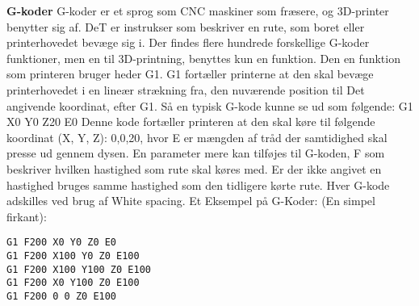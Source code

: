 \textbf{G-koder}
G-koder er et sprog som CNC maskiner som fræsere, og 3D-printer benytter sig af. DeT er instrukser som beskriver en rute, som boret eller printerhovedet bevæge sig i\cite{gkode}. 
Der findes flere hundrede forskellige G-koder funktioner, men en til 3D-printning, benyttes kun en funktion. Den en funktion som printeren bruger heder G1. G1 fortæller printerne at den skal bevæge printerhovedet i en lineær strækning fra, den nuværende position til Det angivende koordinat, efter G1.
Så en typisk G-kode kunne se ud som følgende: \newline
G1 X0 Y0 Z20 E0
\newline
Denne kode fortæller printeren at den skal køre til følgende koordinat (X, Y, Z): 0,0,20, hvor E er mængden af tråd der samtidighed skal presse ud gennem dysen.
En parameter mere kan tilføjes til G-koden, F som beskriver hvilken hastighed som rute skal køres med. Er der ikke angivet en hastighed bruges samme hastighed som den tidligere kørte rute. 
Hver G-kode adskilles ved brug af White spacing.
Et Eksempel på G-Koder: (En simpel firkant):
\begin{lstlisting}
G1 F200 X0 Y0 Z0 E0
G1 F200 X100 Y0 Z0 E100
G1 F200 X100 Y100 Z0 E100
G1 F200 X0 Y100 Z0 E100
G1 F200 0 0 Z0 E100
\end{lstlisting}